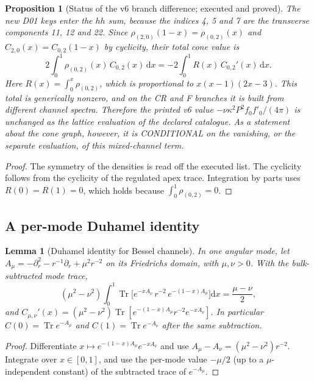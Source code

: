 \documentclass[11pt,a4paper]{article}
\newcommand{\dd}{\mathrm d}
\newcommand{\ka}{\kappa}
\newcommand{\Tr}{\operatorname{Tr}}
\newcommand{\CONDITIONAL}{\textsf{CONDITIONAL}}
\theoremstyle{plain}
\newtheorem{proposition}[theorem]{Proposition}
\newtheorem{lemma}[theorem]{Lemma}
\theoremstyle{definition}
\theoremstyle{remark}
\numberwithin{equation}{section}
\begin{document}
\begin{proposition}[Status of the v6 branch difference; executed and proved]
\label{prop:v8hidden}
The new D01 keys enter the \(hh\) sum, because the indices 4, 5
and 7 are the transverse components 11, 12 and 22.
Since \(\rho_{(2,0)}(1-x)=\rho_{(0,2)}(x)\) and
\(C_{2,0}(x)=C_{0,2}(1-x)\) by cyclicity, their total cone value is
\[
 2\int_0^1\rho_{(0,2)}(x)\,C_{0,2}(x)\,\dd x
 =-2\int_0^1R(x)\,C_{0,2}'(x)\,\dd x .
\]
Here \(R(x)=\int_0^x\rho_{(0,2)}\), which is proportional to
\(x(x-1)(2x-3)\).
This total is generically nonzero, and on the CR and F branches it
is built from different channel spectra.
Therefore the printed v6 value
\(-\nu\ka^2P^2f_0f'_0/(4\pi)\) is unchanged as the lattice
evaluation of the declared catalogue. As a statement about the
cone graph, however, it is \CONDITIONAL{} on the vanishing, or the
separate evaluation, of this mixed-channel term.
\end{proposition}

\begin{proof}
The symmetry of the densities is read off the executed list. The
cyclicity follows from the cyclicity of the regulated apex trace.
Integration by parts uses \(R(0)=R(1)=0\), which holds because
\(\int_0^1\rho_{(0,2)}=0\).
\end{proof}

\subsection{A per-mode Duhamel identity}

\begin{lemma}[Duhamel identity for Bessel channels]
\label{lem:v8duhamel}
In one angular mode, let
\(A_\mu=-\partial_r^2-r^{-1}\partial_r+\mu^2r^{-2}\) on its
Friedrichs domain, with \(\mu,\nu>0\). With the bulk-subtracted
mode trace,
\[
 (\mu^2-\nu^2)\int_0^1\Tr\bigl[e^{-xA_\nu}\,r^{-2}\,e^{-(1-x)A_\mu}\bigr]\dd x
 =\frac{\mu-\nu}2 ,
\]
and \(C_{\mu,\nu}'(x)=(\mu^2-\nu^2)\Tr[e^{-(1-x)A_\mu}r^{-2}e^{-xA_\nu}]\).
In particular \(C(0)=\Tr e^{-A_\mu}\) and \(C(1)=\Tr e^{-A_\nu}\)
after the same subtraction.
\end{lemma}

\begin{proof}
Differentiate \(x\mapsto e^{-(1-x)A_\mu}e^{-xA_\nu}\) and use
\(A_\mu-A_\nu=(\mu^2-\nu^2)r^{-2}\). Integrate over \(x\in[0,1]\),
and use the per-mode value \(-\mu/2\) (up to a \(\mu\)-independent
constant) of the subtracted trace of \(e^{-A_\mu}\).
\end{proof}
\end{document}
